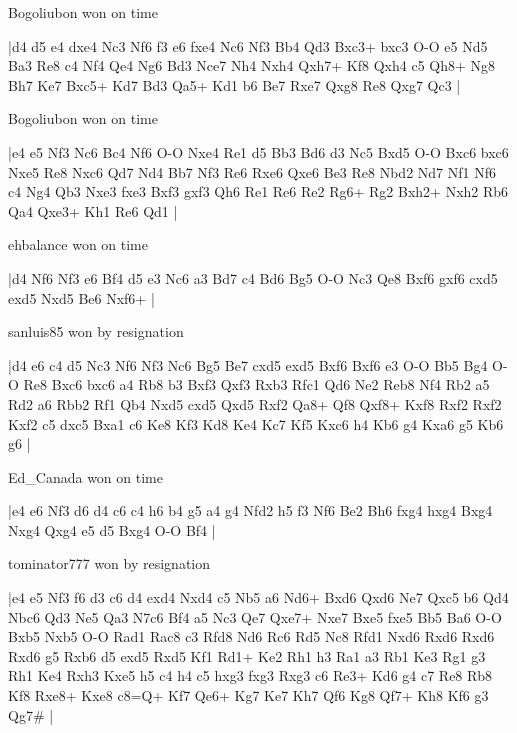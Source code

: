 \showboard

Bogoliubon won on time

\makegametitle
|d4 d5 e4 dxe4 Nc3 Nf6 f3 e6 fxe4 Nc6 Nf3 Bb4 Qd3 Bxc3+ bxc3 O-O e5 Nd5 Ba3 Re8 c4 Nf4 Qe4 Ng6 Bd3 Nce7 Nh4 Nxh4 Qxh7+ Kf8 Qxh4 c5 Qh8+ Ng8 Bh7 Ke7 Bxc5+ Kd7 Bd3 Qa5+ Kd1 b6 Be7 Rxe7 Qxg8 Re8 Qxg7 Qc3  |

\showboard

Bogoliubon won on time

\makegametitle
|e4 e5 Nf3 Nc6 Bc4 Nf6 O-O Nxe4 Re1 d5 Bb3 Bd6 d3 Nc5 Bxd5 O-O Bxc6 bxc6 Nxe5 Re8 Nxc6 Qd7 Nd4 Bb7 Nf3 Re6 Rxe6 Qxe6 Be3 Re8 Nbd2 Nd7 Nf1 Nf6 c4 Ng4 Qb3 Nxe3 fxe3 Bxf3 gxf3 Qh6 Re1 Re6 Re2 Rg6+ Rg2 Bxh2+ Nxh2 Rb6 Qa4 Qxe3+ Kh1 Re6 Qd1  |

\showboard

ehbalance won on time

\makegametitle
|d4 Nf6 Nf3 e6 Bf4 d5 e3 Nc6 a3 Bd7 c4 Bd6 Bg5 O-O Nc3 Qe8 Bxf6 gxf6 cxd5 exd5 Nxd5 Be6 Nxf6+  |

\showboard

sanluis85 won by resignation

\makegametitle
|d4 e6 c4 d5 Nc3 Nf6 Nf3 Nc6 Bg5 Be7 cxd5 exd5 Bxf6 Bxf6 e3 O-O Bb5 Bg4 O-O Re8 Bxc6 bxc6 a4 Rb8 b3 Bxf3 Qxf3 Rxb3 Rfc1 Qd6 Ne2 Reb8 Nf4 Rb2 a5 Rd2 a6 Rbb2 Rf1 Qb4 Nxd5 cxd5 Qxd5 Rxf2 Qa8+ Qf8 Qxf8+ Kxf8 Rxf2 Rxf2 Kxf2 c5 dxc5 Bxa1 c6 Ke8 Kf3 Kd8 Ke4 Kc7 Kf5 Kxc6 h4 Kb6 g4 Kxa6 g5 Kb6 g6  |

\showboard

Ed\_Canada won on time

\makegametitle
|e4 e6 Nf3 d6 d4 c6 c4 h6 b4 g5 a4 g4 Nfd2 h5 f3 Nf6 Be2 Bh6 fxg4 hxg4 Bxg4 Nxg4 Qxg4 e5 d5 Bxg4 O-O Bf4  |

\showboard

tominator777 won by resignation

\makegametitle
|e4 e5 Nf3 f6 d3 c6 d4 exd4 Nxd4 c5 Nb5 a6 Nd6+ Bxd6 Qxd6 Ne7 Qxc5 b6 Qd4 Nbc6 Qd3 Ne5 Qa3 N7c6 Bf4 a5 Nc3 Qe7 Qxe7+ Nxe7 Bxe5 fxe5 Bb5 Ba6 O-O Bxb5 Nxb5 O-O Rad1 Rac8 c3 Rfd8 Nd6 Rc6 Rd5 Nc8 Rfd1 Nxd6 Rxd6 Rxd6 Rxd6 g5 Rxb6 d5 exd5 Rxd5 Kf1 Rd1+ Ke2 Rh1 h3 Ra1 a3 Rb1 Ke3 Rg1 g3 Rh1 Ke4 Rxh3 Kxe5 h5 c4 h4 c5 hxg3 fxg3 Rxg3 c6 Re3+ Kd6 g4 c7 Re8 Rb8 Kf8 Rxe8+ Kxe8 c8=Q+ Kf7 Qe6+ Kg7 Ke7 Kh7 Qf6 Kg8 Qf7+ Kh8 Kf6 g3 Qg7\#  |

